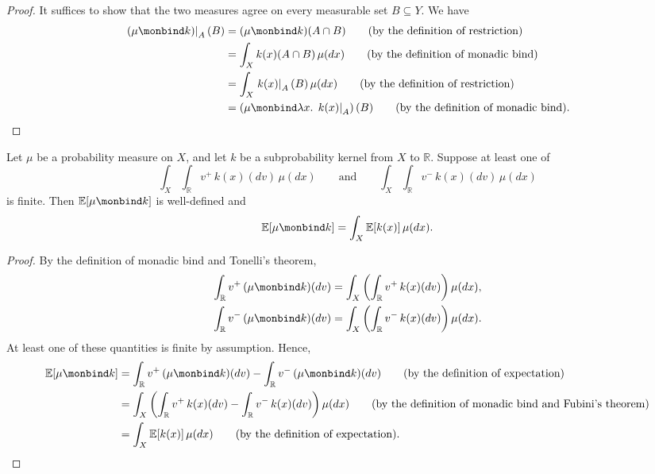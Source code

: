 \begin{proof}
  It suffices to show that the two measures agree on every measurable
  set $B\subseteq Y$. We have
  \begin{align}
    \left.(\mu\monbind k)\right|_A(B)
    &=
    (\mu\monbind k)(A\cap B)
    \tag{\text{by the definition of restriction}}
    \\
    &=
    \int_X k(x)(A\cap B)\,\mu(dx)
    \tag{\text{by the definition of monadic bind}}
    \\
    &=
    \int_X \left.k(x)\right|_A(B)\,\mu(dx)
    \tag{\text{by the definition of restriction}}
    \\
    &=
    \left(
      \mu\monbind\lambda x.\,\left.k(x)\right|_A
    \right)(B)
    \tag{\text{by the definition of monadic bind}}.
  \end{align}
\end{proof}

\begin{lemma}
  \label{lem:extended-expectation-of-bind}
  Let $\mu$ be a probability measure on $X$, and let $k$ be a
  subprobability kernel from $X$ to $\mathbb R$. Suppose at least one
  of
  \[
    \int_X
      \int_{\mathbb R}v^+\,k(x)(dv)\,\mu(dx)
    \qquad\text{and}\qquad
    \int_X
      \int_{\mathbb R}v^-\,k(x)(dv)\,\mu(dx)
  \]
  is finite. Then $\mathbb E[\mu\monbind k]$ is well-defined and
  \[
    \mathbb E[\mu\monbind k]
    =
    \int_X
      \mathbb E[k(x)]\,\mu(dx).
  \]
\end{lemma}

\begin{proof}
  By the definition of monadic bind and Tonelli's theorem,
  \begin{align}
    \int_{\mathbb R}v^+\,(\mu\monbind k)(dv)
    &=
    \int_X
      \left(
        \int_{\mathbb R}v^+\,k(x)(dv)
      \right)
      \mu(dx),
    \\
    \int_{\mathbb R}v^-\,(\mu\monbind k)(dv)
    &=
    \int_X
      \left(
        \int_{\mathbb R}v^-\,k(x)(dv)
      \right)
      \mu(dx).
  \end{align}
  At least one of these quantities is finite by assumption. Hence,
  \begin{align}
    \mathbb E[\mu\monbind k]
    &=
    \int_{\mathbb R}v^+\,(\mu\monbind k)(dv)
    -
    \int_{\mathbb R}v^-\,(\mu\monbind k)(dv)
    \tag{\text{by the definition of expectation}}
    \\
    &=
    \int_X
      \left(
        \int_{\mathbb R}v^+\,k(x)(dv)
        -
        \int_{\mathbb R}v^-\,k(x)(dv)
      \right)
      \mu(dx)
    \tag{\text{by the definition of monadic bind and Fubini's theorem}}
    \\
    &=
    \int_X \mathbb E[k(x)]\,\mu(dx)
    \tag{\text{by the definition of expectation}}.
  \end{align}
\end{proof}

